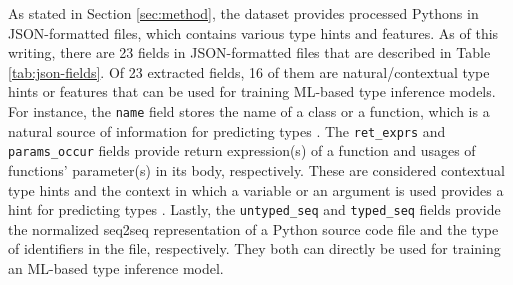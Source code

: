 \documentclass[10pt, conference]{IEEEtran}
\begin{document}
As stated in Section \ref{sec:method}, the dataset provides processed Pythons in JSON-formatted files, which contains various type hints and features. As of this writing, there are 23 fields in JSON-formatted files that are described in Table \ref{tab:json-fields}. Of 23 extracted fields, 16 of them are natural/contextual type hints or features that can be used for training ML-based type inference models. For instance, the \texttt{name} field stores the name of a class or a function, which is a natural source of information for predicting types \cite{malik2019nl2type}. The \texttt{ret\_exprs} and \texttt{params\_occur} fields provide return expression(s) of a function and usages of functions' parameter(s) in its body, respectively. These are considered contextual type hints and the context in which a variable or an argument is used provides a hint for predicting types \cite{pradel2019typewriter}. Lastly, the \texttt{untyped\_seq} and \texttt{typed\_seq} fields provide the normalized seq2seq representation of a Python source code file and the type of identifiers in the file, respectively. They both can directly be used for training an ML-based type inference model.
\end{document}
